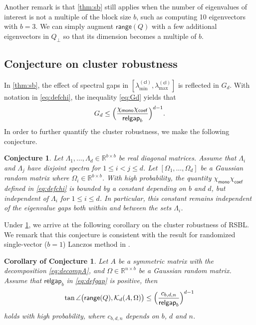 \documentclass{article}
\newtheorem{corollaryC}{Corollary of Conjecture}
\newtheorem{conjecture}{Conjecture}
\newcommand{\chim}{\chi_{\mathsf{mono}}}
\newcommand{\chic}{\chi_{\mathsf{coef}}}
\newcommand{\cl}{(\mathsf{cl})}
\newcommand{\R}{\mathbb{R}}
\newcommand{\range}{\mathsf{range}}
\newcommand{\gap}{\mathsf{relgap}}
\begin{document}
Another remark is that \cref{thm:sb} still applies when the number of eigenvalues of interest is not a multiple of the block size $b$, such as computing 10 eigenvectors with $b=3$. We can simply augment $\range(Q)$ with a few additional eigenvectors in $Q_{\perp}$ so that its dimension becomes a multiple of $b$. 

\subsection{Conjecture on cluster robustness}

In \cref{thm:sb}, the effect of spectral gaps in $[\lambda_{\min}^{\cl},\lambda_{\max}^{\cl}]$ is reflected in $G_{d}$. 
With notation in \cref{eq:defchi}, the inequality \cref{eq:Gd} yields that  
\begin{equation*}
    G_{d} \leq \Bigl(\frac{\chim\chic}{\gap_{b}}\Bigr)^{d-1}.
\end{equation*}
In order to further quantify the cluster robustness, we make the following conjecture.
\begin{conjecture}
    \label{conj:chi}
    Let $\Lambda_{1},\dotsc,\Lambda_{d}\in\R^{b\times b}$ be real diagonal matrices. Assume that $\Lambda_{i}$ and $\Lambda_{j}$ have disjoint spectra for $1\leq i<j\leq d$. Let $[\Omega_{1},\dotsc,\Omega_{d}]$ be a Gaussian random matrix where $\Omega_{i}\in\R^{b\times b}$. With high probability, the quantity $\chim\chic$ defined in \cref{eq:defchi} is bounded by a constant depending on $b$ and $d$, but independent of $\Lambda_{i}$ for $1\leq i\leq d$. In particular, this constant remains independent of the eigenvalue gaps both within and between the sets $\Lambda_{i}$.
\end{conjecture}


Under \cref{conj:chi}, we arrive at the following corollary on the cluster robustness of RSBL. We remark that this conjecture is consistent with the result for randomized single-vector ($b=1$) Lanczos method in \cite[Eq.~(3.5)]{kressner2024randomized}.

\begin{corollaryC}
    \label{conj:sb}
    Let $A$ be a symmetric matrix with the decomposition \cref{eq:decompA}, and $\Omega\in\R^{n\times b}$ be a Gaussian random matrix. Assume that $\gap_{b}$ in \cref{eq:defgap} is positive, then  
    \begin{equation*}
        \tan\angle\bigl(\range(Q),\mathcal{K}_{d}(A,\Omega)\bigr) \leq \Bigl(\frac{c_{b,d,n}}{\gap_{b}}\Bigr)^{d-1}
    \end{equation*}
    holds with high probability, where $c_{b,d,n}$ depends on $b$, $d$ and $n$.
\end{corollaryC}
\end{document}
